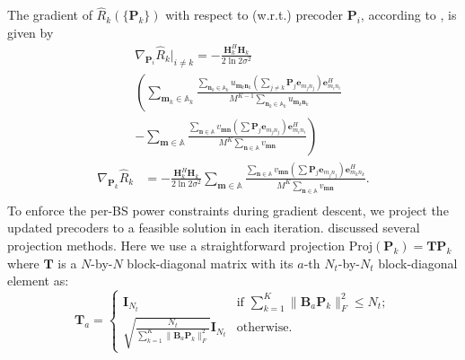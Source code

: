 \documentclass{article}
\begin{document}
    The gradient of $\hat{R}_k(\{\mathbf{P}_k\})$ with respect to (w.r.t.)  precoder $\mathbf{P}_i$, according to \cite{hjorungnes2011complex}, is given by
    \begin{equation}
        \label{eq:gradARSGDP1}
        \begin{aligned}
            & \nabla_{\mathbf{P}_i}\hat{R}_k|_{i\not=k} = -\frac{\mathbf{H}_k^H\mathbf{H}_k}{2\ln2\sigma^2}\\
            & \left(\sum_{\mathbf{m}_k\in \mathbb{A}_k}\frac{\sum_{\mathbf{n}_k\in \mathbb{A}_k}u_{\mathbf{m}_k\mathbf{n}_k}\left(\sum_{j\not=k}\mathbf{P}_j\mathbf{e}_{m_jn_j}\right)\mathbf{e}_{m_in_i}^H}{M^{K-1}\sum_{\mathbf{n}_k\in \mathbb{A}_k}u_{\mathbf{m}_k\mathbf{n}_k}}\right. \\
            & \left. - \sum_{\mathbf{m}\in \mathbb{A}} \frac{\sum_{\mathbf{n}\in \mathbb{A}}v_{\mathbf{m}\mathbf{n}}\left(\sum\mathbf{P}_j\mathbf{e}_{m_jn_j}\right)\mathbf{e}_{m_in_i}^H}{M^K\sum_{\mathbf{n}\in \mathbb{A}}v_{\mathbf{m}\mathbf{n}}}\right)
        \end{aligned}
    \end{equation}
    \begin{equation}
        \label{eq:gradARSGDP2}
        \begin{aligned}
            \nabla_{\mathbf{P}_k}\hat{R}_k & = -\frac{\mathbf{H}_k^H\mathbf{H}_k}{2\ln2\sigma^2}\sum_{\mathbf{m}\in \mathbb{A}}\frac{\sum_{\mathbf{n}\in \mathbb{A}}v_{\mathbf{m}\mathbf{n}}\left(\sum\mathbf{P}_j\mathbf{e}_{m_jn_j}\right)\mathbf{e}_{m_kn_k}^H}{M^K\sum_{\mathbf{n}\in \mathbb{A}}v_{\mathbf{m}\mathbf{n}}}. \\
        \end{aligned}
    \end{equation}
    To enforce the per-BS power constraints during gradient descent, we project the updated precoders to a feasible solution
    in each iteration. \cite{zhang2004cochannel} discussed several projection methods.
    Here we use a straightforward projection $\mbox{Proj}(\mathbf{P}_k)=\mathbf{TP}_k$ where $\mathbf{T}$ is a $N$-by-$N$ block-diagonal matrix
    with its $a$-th $N_t$-by-$N_t$ block-diagonal element as:
    \begin{equation}
        \label{eq:Proj}
           \mathbf{T}_a = \left\{
                             \begin{array}{ll}
                                   \mathbf{I}_{N_{t}} & \mbox{if } \sum_{k=1}^K\|\mathbf{B}_a\mathbf{P}_k\|_F^2 \leq N_t; \\
                                   \sqrt{\frac{N_t}{\sum_{k=1}^K\|\mathbf{B}_a\mathbf{P}_k\|_F^2}}\mathbf{I}_{N_t} & \mbox{otherwise.}
                             \end{array}
                          \right.
    \end{equation}
\end{document}
